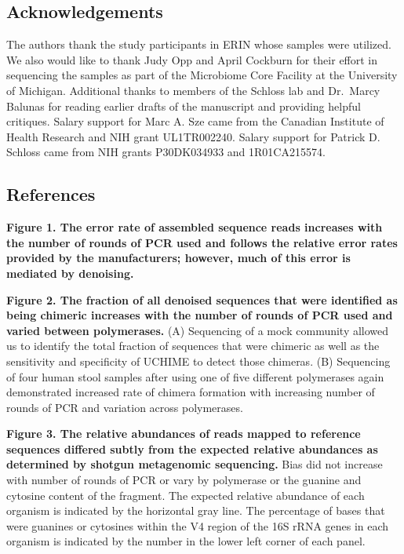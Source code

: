 \documentclass[11,]{article}
\begin{document}
\newpage

\subsection{Acknowledgements}\label{acknowledgements}

The authors thank the study participants in ERIN whose samples were
utilized. We also would like to thank Judy Opp and April Cockburn for
their effort in sequencing the samples as part of the Microbiome Core
Facility at the University of Michigan. Additional thanks to members of
the Schloss lab and Dr.~Marcy Balunas for reading earlier drafts of the
manuscript and providing helpful critiques. Salary support for Marc A.
Sze came from the Canadian Institute of Health Research and NIH grant
UL1TR002240. Salary support for Patrick D. Schloss came from NIH grants
P30DK034933 and 1R01CA215574.

\subsection{References}\label{references}

\textbf{Figure 1. The error rate of assembled sequence reads increases
with the number of rounds of PCR used and follows the relative error
rates provided by the manufacturers; however, much of this error is
mediated by denoising.}

\textbf{Figure 2. The fraction of all denoised sequences that were
identified as being chimeric increases with the number of rounds of PCR
used and varied between polymerases.} (A) Sequencing of a mock community
allowed us to identify the total fraction of sequences that were
chimeric as well as the sensitivity and specificity of UCHIME to detect
those chimeras. (B) Sequencing of four human stool samples after using
one of five different polymerases again demonstrated increased rate of
chimera formation with increasing number of rounds of PCR and variation
across polymerases.

\textbf{Figure 3. The relative abundances of reads mapped to reference
sequences differed subtly from the expected relative abundances as
determined by shotgun metagenomic sequencing.} Bias did not increase
with number of rounds of PCR or vary by polymerase or the guanine and
cytosine content of the fragment. The expected relative abundance of
each organism is indicated by the horizontal gray line. The percentage
of bases that were guanines or cytosines within the V4 region of the 16S
rRNA genes in each organism is indicated by the number in the lower left
corner of each panel.
\end{document}
